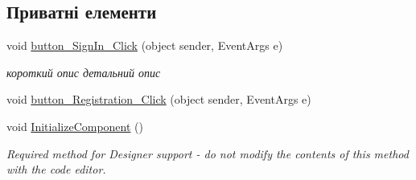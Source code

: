 \subsection*{Приватні елементи}
\begin{DoxyCompactItemize}
\item 
void \hyperlink{class_tests_1_1_form1_a861240fc111a9f0c68cdc64138e1a8e3}{button\+\_\+\+Sign\+In\+\_\+\+Click} (object sender, Event\+Args e)
\begin{DoxyCompactList}\small\item\em короткий опис детальний опис \end{DoxyCompactList}\item 
void \hyperlink{class_tests_1_1_form1_a607e53e1c4cb0f90ec5920fa5225f6bb}{button\+\_\+\+Registration\+\_\+\+Click} (object sender, Event\+Args e)
\item 
void \hyperlink{class_tests_1_1_form1_a66bdf3e4f89c528e5c2d6b1539db6488}{Initialize\+Component} ()
\begin{DoxyCompactList}\small\item\em Required method for Designer support -\/ do not modify the contents of this method with the code editor. \end{DoxyCompactList}\end{DoxyCompactItemize}
